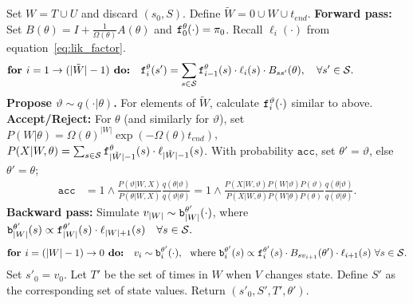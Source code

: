 \begin{algorithm}[H]
\begin{algorithmic}[1]
      \State 
      Set $W = T \cup U$ and discard $(s_0,S)$. Define $\tilde{W} = 0 \cup W \cup t_{end}$.
    \State 
    \textbf{Forward pass:}
    Set $B(\theta) = I + \frac{1}{\Omega(\theta)}A(\theta)$ and
    $\mathtt{f}^\theta_0(\cdot) = \pi_0$. Recall $\ell_i(\cdot)$ from equation~\eqref{eq:lik_factor}.
\vspace{-.25in}
$$\textbf{for } i=1\rightarrow (|\tilde{W}|-1)\textbf{ do:} \quad \mathtt{f}^{\theta}_i(s') = \sum_{s \in {\mathcal S}} \mathtt{f}^\theta_{i-1}(s)\cdot \ell_{i}(s) \cdot B_{ss'}(\theta), \quad \forall s' \in {\mathcal S}.\qquad\qquad\quad $$
    \State \textbf{Propose $\vartheta \sim q(\cdot| \theta)$.}
    For elements of $\tilde{W}$, calculate $\mathtt{f}^\vartheta_i(\cdot)$ similar to above.
      \State \textbf{Accept/Reject:} 
      For $\theta$ (and similarly for $\vartheta$), set  
      $P(W|\theta) = \Omega(\theta)^{|W|}\exp(-\Omega(\theta)t_{end})$, 
      $P(X|W,\theta) = \sum_{s \in {\mathcal S}} \mathtt{f}_{|\tilde{W}|-1}^\theta(s)\cdot\ell_{|\tilde{W}|-1}(s)$.
      With probability $\texttt{acc}$, set $\theta' = \vartheta$, else $\theta'=\theta$; %
          \begin{align}
            \label{eq:ncp_acc}
            \texttt{acc} &=  1 \wedge \frac{P(\vartheta|W, X)}{P(\theta|W, X)} \frac{q(\theta|\vartheta)}{q(\vartheta|\theta)}
          =  1 \wedge \frac{P(X| W,\vartheta) P(W | \vartheta)P(\vartheta)}
            {P(X|W, \theta)P(W | \theta)P(\theta)} \frac{q(\theta|\vartheta)}{q(\vartheta|\theta)}.
          \end{align}
    \State %
    \textbf{Backward pass:}
    Simulate $v_{|W|} \sim \mathtt{b}^{\theta'}_{|W|}(\cdot)$, where $\mathtt{b}^{\theta'}_{|W|}(s) \propto \mathtt{f}^{\theta'}_{|W|}(s)\cdot\ell_{|W|+1}(s) \quad \forall s \in {\mathcal S}.$ 
\vspace{-.25in}
    $$ \textbf{for } i=(|W|-1)\rightarrow 0\textbf{ do:} \quad v_i \sim \mathtt{b}^{\theta'}_i(\cdot),\ \ \text{where } 
    \mathtt{b}^{\theta'}_i(s) \propto \mathtt{f}^{\theta'}_i(s)\cdot B_{sv_{i+1}}(\theta') \cdot \ell_{i+1}(s)  \ \forall s \in {\mathcal S}.$$
    \State Set $s'_0=v_0$. Let $T'$ be the set of times in $W$ when $V$ changes state. Define $S'$ as the corresponding set of state values. Return $(s'_0, S', T', \theta')$.
\end{algorithmic}
\end{algorithm}
